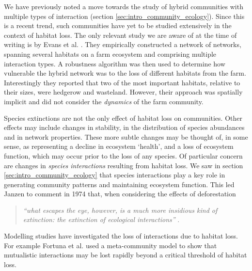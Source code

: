 We have previously noted a move towards the study of hybrid communities with multiple types of interaction (section \ref{sec:intro_community_ecology}). Since this is a recent trend, such communities have yet to be studied extensively in the context of habitat loss. The only relevant study we are aware of at the time of writing is by Evans et al. \cite{evans2013robustness}. They empirically constructed a network of networks, spanning several habitats on a farm ecosystem and comprising multiple interaction types. A robustness algorithm was then used to determine how vulnerable the hybrid network was to the loss of different habitats from the farm. Interestingly they reported that two of the most important habitats, relative to their sizes, were hedgerow and wasteland. However, their approach was spatially implicit and did not consider the \emph{dynamics} of the farm community. 

Species extinctions are not the only effect of habitat loss on communities. Other effects may include changes in stability, in the distribution of species abundances and in network properties. These more subtle changes may be thought of, in some sense, as representing a decline in ecosystem `health', and a loss of ecosystem function, which may occur prior to the loss of any species. Of particular concern are changes in \emph{species interactions} resulting from habitat loss. We saw in section \ref{sec:intro_community_ecology} that species interactions play a key role in generating community patterns and maintaining ecosystem function. This led Janzen to comment in 1974 that, when considering the effects of deforestation

\begin{quote}
 \emph{``what escapes the eye, however, is a much more insidious kind of extinction: the extinction of ecological interactions''} \cite{janzen1974}.
\end{quote}
%
Modelling studies have investigated the loss of interactions due to habitat loss. For example Fortuna et al. \cite{fortuna2013habitat} used a meta-community model to show that mutualistic interactions may be lost rapidly beyond a critical threshold of habitat loss. 

